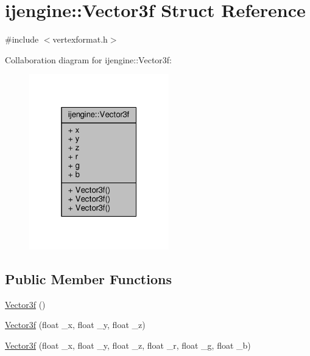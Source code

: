 \hypertarget{structijengine_1_1Vector3f}{\section{ijengine\-:\-:Vector3f Struct Reference}
\label{structijengine_1_1Vector3f}
}


{\ttfamily \#include $<$vertexformat.\-h$>$}



Collaboration diagram for ijengine\-:\-:Vector3f\-:\nopagebreak
\begin{figure}[H]
\begin{center}
\leavevmode
\includegraphics[width=172pt]{structijengine_1_1Vector3f__coll__graph}
\end{center}
\end{figure}
\subsection*{Public Member Functions}
\begin{DoxyCompactItemize}
\item 
\hyperlink{structijengine_1_1Vector3f_a64ff073054db67b57009602892f3c8fa}{Vector3f} ()
\item 
\hyperlink{structijengine_1_1Vector3f_a50975b389d1a92cbb68bbf82864ce929}{Vector3f} (float \-\_\-x, float \-\_\-y, float \-\_\-z)
\item 
\hyperlink{structijengine_1_1Vector3f_a326dfdae474265681ec0a6d85fa05e20}{Vector3f} (float \-\_\-x, float \-\_\-y, float \-\_\-z, float \-\_\-r, float \-\_\-g, float \-\_\-b)
\end{DoxyCompactItemize}
